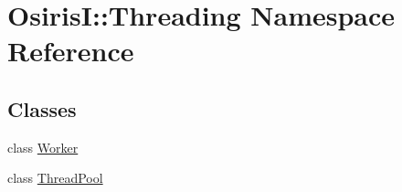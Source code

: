 \hypertarget{namespace_osiris_i_1_1_threading}{\section{Osiris\-I\-:\-:Threading Namespace Reference}
\label{namespace_osiris_i_1_1_threading}
}
\subsection*{Classes}
\begin{DoxyCompactItemize}
\item 
class \hyperlink{class_osiris_i_1_1_threading_1_1_worker}{Worker}
\item 
class \hyperlink{class_osiris_i_1_1_threading_1_1_thread_pool}{Thread\-Pool}
\end{DoxyCompactItemize}
